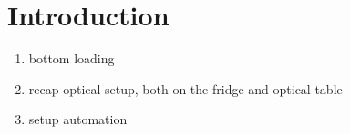 \chapter{Introduction}\label{ch:setup:introduction}
\begin{enumerate}
    \item bottom loading
    \item recap optical setup, both on the fridge and optical table
    \item setup automation
\end{enumerate}
